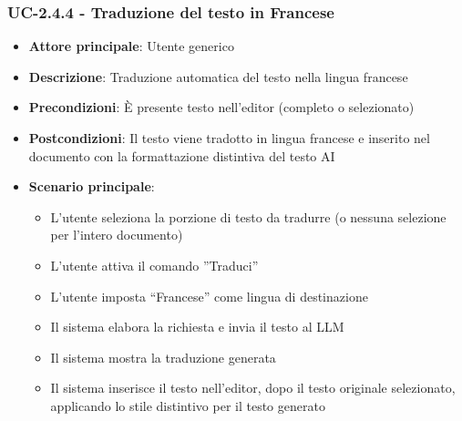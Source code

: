 \documentclass[11pt,a4paper]{article}
\begin{document}
\subsubsection{UC-2.4.4 - Traduzione del testo in Francese}
    \begin{itemize}
    \item \textbf{Attore principale}: Utente generico
    \item \textbf{Descrizione}: Traduzione automatica del testo nella lingua francese
    \item \textbf{Precondizioni}: È presente testo nell’editor (completo o selezionato)
    \item \textbf{Postcondizioni}: Il testo viene tradotto in lingua francese e inserito nel documento con la formattazione distintiva del testo AI
    \item \textbf{Scenario principale}:
    \begin{itemize}
        \item L’utente seleziona la porzione di testo da tradurre (o nessuna selezione per l'intero documento)
        \item L’utente attiva il comando ”Traduci”
        \item L’utente imposta “Francese” come lingua di destinazione
        \item Il sistema elabora la richiesta e invia il testo al LLM
        \item Il sistema mostra la traduzione generata
        \item Il sistema inserisce il testo nell'editor, dopo il testo originale selezionato, applicando lo stile distintivo per il testo generato
    \end{itemize}
\end{itemize}
\end{document}
